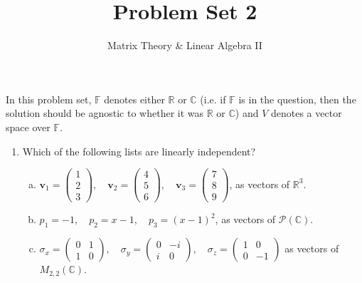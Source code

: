 \documentclass[a4paper,11pt]{article}
\title{Problem Set 2}
\author{Matrix Theory \& Linear Algebra II}
\date{}
\theoremstyle{definition}
\begin{document}
\maketitle
\thispagestyle{empty}

\noindent
In this problem set, $\mathbb F$ denotes either $\mathbb R$ or $\mathbb C$ (i.e. if $\mathbb F$ is in the question, then the solution should be agnostic to whether it was $\mathbb R$ or $\mathbb C$) and $V$ denotes a vector space over $\mathbb F$.

\begin{enumerate}[(1)]
\item
Which of the following lists are linearly independent?
\begin{enumerate}[(a)]
    \item 
    $
    \mathbf{v}_1 = \begin{pmatrix} 1 \\ 2 \\ 3 \end{pmatrix}, \quad
    \mathbf{v}_2 = \begin{pmatrix} 4 \\ 5 \\ 6 \end{pmatrix}, \quad
    \mathbf{v}_3 = \begin{pmatrix} 7 \\ 8 \\ 9 \end{pmatrix}
    $,
    as vectors of $\mathbb R^3$.
    \item 
    $
    p_1 = -1, \quad
    p_2 = x-1, \quad
    p_3 = (x-1)^2$,
    as vectors of $\mathcal P(\mathbb C)$.
    \item
    $
    \sigma_x=
    \begin{pmatrix} 0 & 1 \\ 1 & 0 \end{pmatrix}, \quad \sigma_y = \begin{pmatrix} 0 & -i \\ i & 0 \end{pmatrix}, \quad \sigma_z = \begin{pmatrix} 1 & 0 \\ 0 & -1 \end{pmatrix}
    $
    as vectors of $M_{2,2}(\mathbb C)$.
\end{enumerate}


\end{enumerate}
\end{document}
